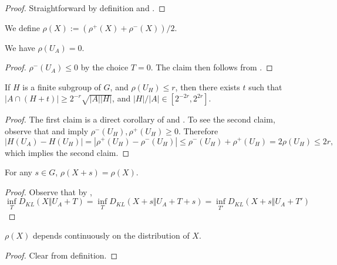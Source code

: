 \begin{proof} Straightforward by definition and .
\end{proof}

\begin{definition}  We define $\rho(X) := (\rho^+(X) + \rho^-(X))/2$.
\end{definition}

\begin{lemma}\label{rho-init}  We have $\rho(U_A) = 0$.
\end{lemma}

\begin{proof} $\rho^-(U_A)\le 0$ by the choice $T=0$. The claim then follows from .
\end{proof}

\begin{lemma}\label{rho-subgroup}  If $H$ is a finite subgroup of $G$, and $\rho(U_H) \leq r$, then there exists $t$ such that $|A \cap (H+t)| \geq 2^{-r} \sqrt{|A||H|}$, and $|H|/|A|\in[2^{-2r},2^{2r}]$.
\end{lemma}

\begin{proof} The first claim is a direct corollary of  and . To see the second claim, observe that  and  imply $\rho^-(U_H),\rho^+(U_H)\ge 0$. Therefore $$|H(U_A)-H(U_H)|=|\rho^+(U_H)-\rho^-(U_H)|\le \rho^-(U_H)+\rho^+(U_H)= 2\rho(U_H)\le 2r,$$
  which implies the second claim.
\end{proof}

\begin{lemma}\label{rho-invariant}  For any $s \in G$, $\rho(X+s) = \rho(X)$.
\end{lemma}

\begin{proof} Observe that by , $$\inf_T D_{KL}(X\Vert U_A+T)=\inf_T D_{KL}(X+s\Vert U_A+T+s)=\inf_{T'} D_{KL}(X+s\Vert U_A+T')$$
\end{proof}

\begin{lemma}\label{rho-cts} $\rho(X)$ depends continuously on the distribution of $X$.
\end{lemma}

\begin{proof}  Clear from definition.
\end{proof}

